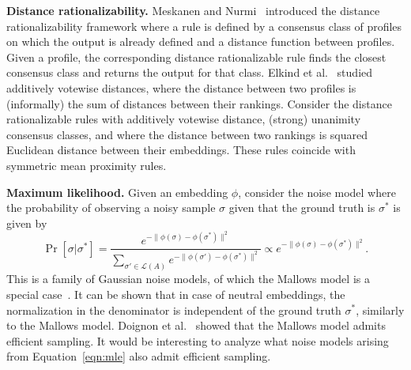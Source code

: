 \documentclass[prodmode]{acmsmall-ec14}
\newcommand{\calL}{{\mathcal{L}}}
\newcommand{\rank}{{\calL(A)}}
\begin{document}
\medskip
\noindent \textbf{Distance rationalizability.} Meskanen and Nurmi~ introduced the distance rationalizability framework where a rule is defined by a consensus class of profiles on which the output is already defined and a distance function between profiles. Given a profile, the corresponding distance rationalizable rule finds the closest consensus class and returns the output for that class. Elkind et al.~ studied additively votewise distances, where the distance between two profiles is (informally) the sum of distances between their rankings. Consider the distance rationalizable rules with additively votewise distance, (strong) unanimity consensus classes, and where the distance between two rankings is squared Euclidean distance between their embeddings. These rules coincide with symmetric mean proximity rules. 


\medskip
\noindent \textbf{Maximum likelihood.} Given an embedding $\phi$, consider the noise model where the probability of observing a noisy sample $\sigma$ given that the ground truth is $\sigma^*$ is given by 
\begin{equation}
\Pr[\sigma | \sigma^*] = \frac{e^{-\|\phi(\sigma)-\phi(\sigma^*)\|^2}}{\sum_{\sigma' \in \rank} e^{-\|\phi(\sigma')-\phi(\sigma^*)\|^2}} \propto e^{-\|\phi(\sigma)-\phi(\sigma^*)\|^2}.
\label{eqn:mle}
\end{equation}
%
This is a family of Gaussian noise models, of which the Mallows model is a special case~\cite{Mall57}. It can be shown that in case of neutral embeddings, the normalization in the denominator is independent of the ground truth $\sigma^*$, similarly to the Mallows model. Doignon et al.~ showed that the Mallows model admits efficient sampling. It would be interesting to analyze what noise models arising from Equation~\eqref{eqn:mle} also admit efficient sampling. 
\end{document}
